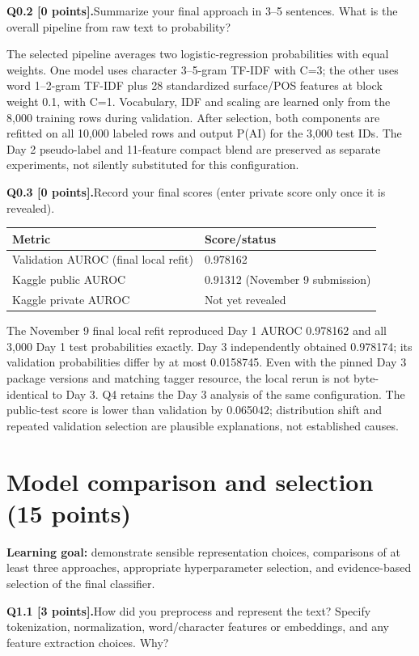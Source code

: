 \documentclass[11pt,letterpaper]{article}
\newcommand{\question}[2]{\needspace{4\baselineskip}\par\addvspace{0.45em}\noindent\textbf{#1}\quad #2\par\nobreak\vspace{0.1em}}
\begin{document}
\question{Q0.2 [0 points].}{Summarize your final approach in 3--5 sentences. What is the overall pipeline from raw text to probability?}

The selected pipeline averages two logistic-regression probabilities with equal weights. One model uses character 3--5-gram TF-IDF with C=3; the other uses word 1--2-gram TF-IDF plus 28 standardized surface/POS features at block weight 0.1, with C=1. Vocabulary, IDF and scaling are learned only from the 8,000 training rows during validation. After selection, both components are refitted on all 10,000 labeled rows and output P(AI) for the 3,000 test IDs. The Day 2 pseudo-label and 11-feature compact blend are preserved as separate experiments, not silently substituted for this configuration.

\question{Q0.3 [0 points].}{Record your final scores (enter private score only once it is revealed).}

\begin{tabularx}{\linewidth}{@{}Yp{2.5in}@{}}\toprule Metric & Score/status \\ \midrule
Validation AUROC (final local refit) & 0.978162 \\
Kaggle public AUROC & 0.91312 (November 9 submission) \\
Kaggle private AUROC & Not yet revealed \\
\bottomrule\end{tabularx}
The November 9 final local refit reproduced Day 1 AUROC 0.978162 and all 3,000 Day 1 test probabilities exactly. Day 3 independently obtained 0.978174; its validation probabilities differ by at most 0.0158745. Even with the pinned Day 3 package versions and matching tagger resource, the local rerun is not byte-identical to Day 3. Q4 retains the Day 3 analysis of the same configuration. The public-test score is lower than validation by 0.065042; distribution shift and repeated validation selection are plausible explanations, not established causes.

\newpage
\section{Model comparison and selection (15 points)}

\textbf{Learning goal:} demonstrate sensible representation choices, comparisons of at least three approaches, appropriate hyperparameter selection, and evidence-based selection of the final classifier.

\question{Q1.1 [3 points].}{How did you preprocess and represent the text? Specify tokenization, normalization, word/character features or embeddings, and any feature extraction choices. Why?}
\end{document}
